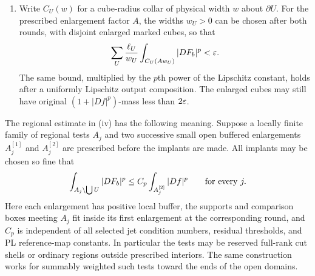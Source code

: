\begin{proposition}
\begin{enumerate}[label=\textup{(\roman*)}]
\begin{equation}
 \int_{\bigcup U}(1+|Df|^p)<\eps.
\end{equation}
For $p\geq3$ this family is empty.  Off the marked cubes the energy
has the universal buffered regional estimate described below.
\item Write $C_U(w)$ for a cube-radius collar of physical width $w$
about $\partial U$.  For the prescribed enlargement factor $A$, the
widths $w_U>0$ can be chosen after both rounds, with disjoint enlarged
marked cubes, so that
\begin{equation}\label{hp:marked-collar-budget}
 \sum_U\frac{\ell_U}{w_U}
             \int_{C_U(Aw_U)}|DF_b|^p<\varepsilon.
\end{equation}
The same bound, multiplied by the $p$th power of the Lipschitz
constant, holds after a uniformly Lipschitz output composition.
The enlarged cubes may still have original $(1+|Df|^p)$-mass less
than $2\varepsilon$.
\end{enumerate}

The regional estimate in \textup{(iv)} has the following meaning.
Suppose a locally finite family of regional tests $A_j$ and two
successive small open buffered enlargements $A_j^{[1]}$ and
$A_j^{[2]}$ are prescribed before the implants are made.  All implants
may be chosen so fine that
\begin{equation}\label{hp:regional-energy}
 \int_{A_j\setminus\bigcup U}|DF_b|^p
       \leq C_p\int_{A_j^{[2]}}|Df|^p
       \qquad\hbox{for every }j.
\end{equation}
Here each enlargement has positive local buffer, the supports and
comparison boxes meeting $A_j$ fit inside its first enlargement at
the corresponding round, and $C_p$ is independent of all selected
jet condition numbers, residual thresholds, and PL reference-map
constants.  In particular the tests may be reserved full-rank cut
shells or ordinary regions outside prescribed interiors.  The same
construction works for summably weighted such tests toward the ends
of the open domains.
\end{proposition}


